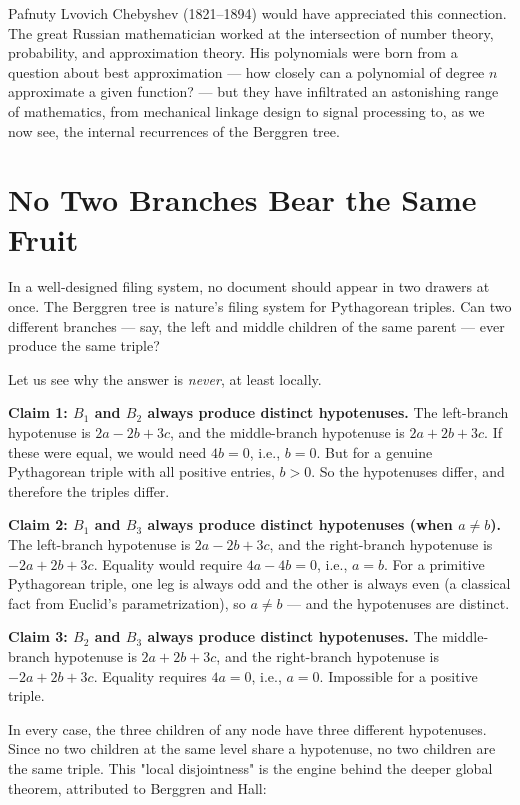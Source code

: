 \documentclass[11pt,twoside,openright]{book}
\theoremstyle{definition}
\theoremstyle{remark}
\begin{document}
Pafnuty Lvovich Chebyshev (1821--1894) would have appreciated this connection. The great Russian mathematician worked at the intersection of number theory, probability, and approximation theory. His polynomials were born from a question about best approximation --- how closely can a polynomial of degree $n$ approximate a given function? --- but they have infiltrated an astonishing range of mathematics, from mechanical linkage design to signal processing to, as we now see, the internal recurrences of the Berggren tree.



\section{No Two Branches Bear the Same Fruit}

In a well-designed filing system, no document should appear in two drawers at once. The Berggren tree is nature's filing system for Pythagorean triples. Can two different branches --- say, the left and middle children of the same parent --- ever produce the same triple?

Let us see why the answer is \textit{never}, at least locally.

\textbf{Claim 1: $B_1$ and $B_2$ always produce distinct hypotenuses.} The left-branch hypotenuse is $2a - 2b + 3c$, and the middle-branch hypotenuse is $2a + 2b + 3c$. If these were equal, we would need $4b = 0$, i.e., $b = 0$. But for a genuine Pythagorean triple with all positive entries, $b > 0$. So the hypotenuses differ, and therefore the triples differ.

\textbf{Claim 2: $B_1$ and $B_3$ always produce distinct hypotenuses (when $a \neq b$).} The left-branch hypotenuse is $2a - 2b + 3c$, and the right-branch hypotenuse is $-2a + 2b + 3c$. Equality would require $4a - 4b = 0$, i.e., $a = b$. For a primitive Pythagorean triple, one leg is always odd and the other is always even (a classical fact from Euclid's parametrization), so $a \neq b$ --- and the hypotenuses are distinct.

\textbf{Claim 3: $B_2$ and $B_3$ always produce distinct hypotenuses.} The middle-branch hypotenuse is $2a + 2b + 3c$, and the right-branch hypotenuse is $-2a + 2b + 3c$. Equality requires $4a = 0$, i.e., $a = 0$. Impossible for a positive triple.

In every case, the three children of any node have three different hypotenuses. Since no two children at the same level share a hypotenuse, no two children are the same triple. This "local disjointness" is the engine behind the deeper global theorem, attributed to Berggren and Hall:
\end{document}
